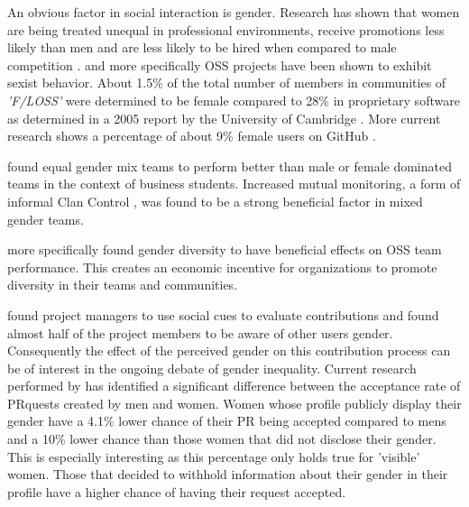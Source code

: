 An obvious factor in social interaction is gender. Research has shown that women are being treated unequal in professional environments, receive promotions less likely than men and are less likely to be hired when compared to male competition \cite{Davison2000225, doi:10.1177/0149206310374774}.
and more specifically \ac{OSS} projects have been shown to exhibit sexist behavior. About 1.5\% of the total number of members in communities of \emph{'\ac{F/LOSS}'} were determined to be female compared to 28\% in proprietary software as determined in a 2005 report by the University of Cambridge \cite{flosspols-gender:2005}. More current research shows a percentage of about 9\% female users on GitHub \cite{Vasilescu:2015:GTD:2702123.2702549}.

\citeauthor{10.2307/23443867} found equal gender mix teams to perform better than male or female dominated teams in the context of business students. Increased mutual monitoring, a form of informal Clan Control \cite{doi:10.1287/orsc.7.1.1}, was found to be a strong beneficial factor in mixed gender teams.

\citeauthor{Vasilescu:2015:GTD:2702123.2702549} more specifically found gender diversity to have beneficial effects on \ac{OSS} team performance. This creates an economic incentive for organizations to promote diversity in their teams and communities.

\citeauthor{Tsay:2014:IST:2568225.2568315} found project managers to use social cues to evaluate contributions and \citeauthor{Vasilescu:2015:GTD:2702123.2702549} found almost half of the project members to be aware of other users gender. Consequently the effect of the perceived gender on this contribution process can be of interest in the ongoing debate of gender inequality. Current research performed by \citeauthor{genderdiff:2016} has identified a significant difference between the acceptance rate of \ac{PR}quests created by men and women. Women whose profile publicly display their gender have a 4.1\% lower chance of their \ac{PR} being accepted compared to mens and a 10\% lower chance than those women that did not disclose their gender. This is especially interesting as this percentage only holds true for 'visible'
women. Those that decided to withhold information about their gender in their profile have a higher chance of having their request accepted.


